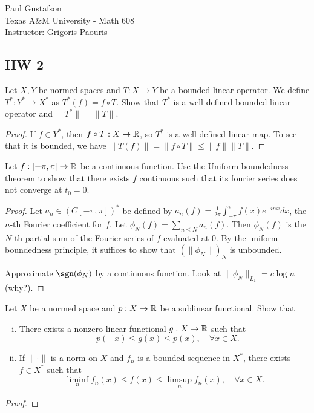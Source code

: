 \documentclass{article}
\begin{document}
\noindent Paul Gustafson\\
\noindent Texas A\&M University - Math 608 \\ 
\noindent Instructor: Grigoris Paouris

\subsection*{HW 2}
 Let $X, Y$ be normed spaces and $T: X \to Y$ be a bounded linear operator.  We define $T^*: Y^* \to X^*$ as $T^*(f) = f \circ T$. Show that $T^*$ is a well-defined bounded linear operator and $\|T^*\| = \|T\|$.

\begin{proof}
If $f \in Y^*$, then $f \circ T: X \to \mathbb{R}$, so $T^*$ is a well-defined linear map. To see that it is bounded, we have $\|T(f)\| = \|f \circ T\| \le \|f\| \|T\|$.
\end{proof}


 Let $f : [-\pi, \pi] \to \mathbb{R}$ be a continuous function. Use the Uniform boundedness theorem to show that there exists $f$ continuous such that its fourier series does not converge at $t_0 = 0$. %
\begin{proof}
Let $a_n \in (C[-\pi, \pi])^*$ be defined by $a_n(f) = \frac 1 {2\pi} \int_{-\pi}^\pi f(x) e^{-inx} dx$, the $n$-th Fourier coefficient for $f$. Let $\phi_N(f) = \sum_{n \le N} a_n(f)$. Then $\phi_N(f)$ is the $N$-th partial sum of the Fourier series of $f$ evaluated at $0$. By the uniform boundedness principle, it suffices to show that $(\|\phi_N\|)_N$ is unbounded.

Approximate $\sgn(\phi_N)$ by a continuous function.  Look at $\|\phi_N\|_{L_1} = c \log n$ (why?).

\end{proof}

 Let $X$ be a normed space and $p: X \to \mathbb{R}$ be a sublinear functional. Show that 
\begin{enumerate}[i)]
\item There exists a nonzero linear functional $g : X \to \mathbb{R}$ such that 
$$ -p(-x) \le g(x) \le p(x), \quad \forall x \in X.$$
\item If $\|\cdot\|$ is a norm on $X$ and $f_n$ is a bounded sequence in $X^*$, there exists $f \in X^*$ such that 
$$\liminf_n f_n(x) \le f(x) \le \limsup_n f_n(x) , \quad \forall x \in X.$$
\end{enumerate}

\begin{proof}


\end{proof}
\end{document}
